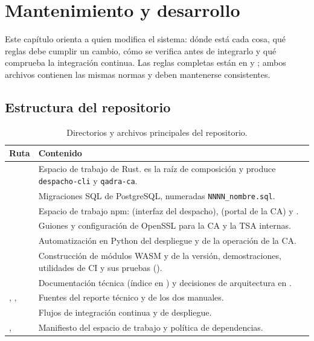 \chapter{Mantenimiento y desarrollo}\label{cap:mantenimiento}

Este capítulo orienta a quien modifica el sistema: dónde está cada cosa, qué
reglas debe cumplir un cambio, cómo se verifica antes de integrarlo y qué
comprueba la integración continua. Las reglas completas están en
 y ; ambos archivos contienen las
mismas normas y deben mantenerse consistentes.

\section{Estructura del repositorio}\label{sec:mant-estructura}

\begin{table}[H]
  \centering
  \caption{Directorios y archivos principales del repositorio.}\label{tab:mant-estructura}
  \begin{tabularx}{\textwidth}{L{4.4cm} Y}
    \toprule
    \textbf{Ruta} & \textbf{Contenido} \\
    \midrule
      & Espacio de trabajo de Rust.  es la raíz de
        composición y produce \texttt{despacho-cli} y \texttt{qadra-ca}. \\
      & Migraciones SQL de PostgreSQL, numeradas \texttt{NNNN\_nombre.sql}. \\
      & Espacio de trabajo npm:  (interfaz del despacho),
         (portal de la CA) y . \\
      & Guiones y configuración de OpenSSL para la CA y la TSA internas. \\
      & Automatización en Python del despliegue y de la operación de la CA. \\
      & Construcción de módulos WASM y de la versión, demostraciones,
        utilidades de CI y sus pruebas (). \\
      & Documentación técnica (índice en ) y
        decisiones de arquitectura en . \\
    , , 
      & Fuentes del reporte técnico y de los dos manuales. \\
      & Flujos de integración continua y de despliegue. \\
    , 
      & Manifiesto del espacio de trabajo y política de dependencias. \\
    \bottomrule
  \end{tabularx}
\end{table}

